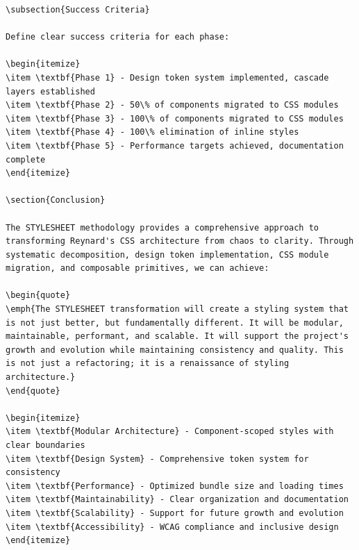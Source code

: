 \documentclass[11pt]{article}
\begin{document}
\begin{lstlisting}[style=markdown]
\subsection{Success Criteria}

Define clear success criteria for each phase:

\begin{itemize}
\item \textbf{Phase 1} - Design token system implemented, cascade layers established
\item \textbf{Phase 2} - 50\% of components migrated to CSS modules
\item \textbf{Phase 3} - 100\% of components migrated to CSS modules
\item \textbf{Phase 4} - 100\% elimination of inline styles
\item \textbf{Phase 5} - Performance targets achieved, documentation complete
\end{itemize}

\section{Conclusion}

The STYLESHEET methodology provides a comprehensive approach to transforming Reynard's CSS architecture from chaos to clarity. Through systematic decomposition, design token implementation, CSS module migration, and composable primitives, we can achieve:

\begin{quote}
\emph{The STYLESHEET transformation will create a styling system that is not just better, but fundamentally different. It will be modular, maintainable, performant, and scalable. It will support the project's growth and evolution while maintaining consistency and quality. This is not just a refactoring; it is a renaissance of styling architecture.}
\end{quote}

\begin{itemize}
\item \textbf{Modular Architecture} - Component-scoped styles with clear boundaries
\item \textbf{Design System} - Comprehensive token system for consistency
\item \textbf{Performance} - Optimized bundle size and loading times
\item \textbf{Maintainability} - Clear organization and documentation
\item \textbf{Scalability} - Support for future growth and evolution
\item \textbf{Accessibility} - WCAG compliance and inclusive design
\end{itemize}


\end{lstlisting}
\end{document}
